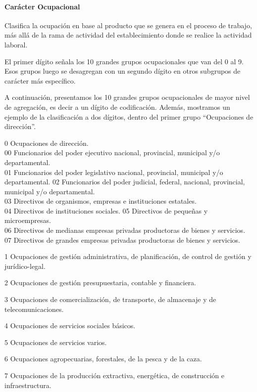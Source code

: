 \documentclass[
]{book}
\begin{document}
\hypertarget{caruxe1cter-ocupacional}{%
\paragraph{Carácter Ocupacional}\label{caruxe1cter-ocupacional}}

Clasifica la ocupación en base al producto que se genera en el proceso de trabajo, más allá de la rama de actividad del establecimiento donde se realice la actividad laboral.

El primer dígito señala los 10 grandes grupos ocupacionales que van del 0 al 9. Esos grupos luego se desagregan con un segundo dígito en otros subgrupos de carácter más específico.

A continuación, presentamos los 10 grandes grupos ocupacionales de mayor nivel de agregación, es decir a un dígito de codificación. Además, mostramos un ejemplo de la clasificación a dos dígitos, dentro del primer grupo ``Ocupaciones de dirección''.

0 Ocupaciones de dirección.\\
00 Funcionarios del poder ejecutivo nacional, provincial, municipal y/o departamental.\\
01 Funcionarios del poder legislativo nacional, provincial, municipal y/o departamental.
02 Funcionarios del poder judicial, federal, nacional, provincial, municipal y/o departamental.\\
03 Directivos de organismos, empresas e instituciones estatales.\\
04 Directivos de instituciones sociales.
05 Directivos de pequeñas y microempresas.\\
06 Directivos de medianas empresas privadas productoras de bienes y servicios.\\
07 Directivos de grandes empresas privadas productoras de bienes y servicios.

1 Ocupaciones de gestión administrativa, de planificación, de control de gestión y jurídico-legal.

2 Ocupaciones de gestión presupuestaria, contable y financiera.

3 Ocupaciones de comercialización, de transporte, de almacenaje y de telecomunicaciones.

4 Ocupaciones de servicios sociales básicos.

5 Ocupaciones de servicios varios.

6 Ocupaciones agropecuarias, forestales, de la pesca y de la caza.

7 Ocupaciones de la producción extractiva, energética, de construcción e infraestructura.
\end{document}
